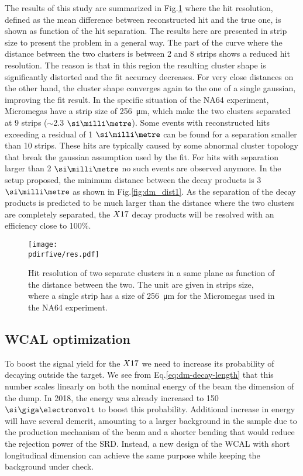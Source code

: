 The results of this study are summarized in Fig.\ref{fig:res-hit} where the hit resolution, defined as the mean difference between reconstructed hit and the true one, is shown as function of the hit separation. The results here are presented in strip size to present the problem in a general way. The part of the curve where the distance between the two clusters is between 2 and 8 strips shows a reduced hit resolution. The reason is that in this region the resulting cluster shape is significantly distorted and the fit accuracy decreases. For very close distances on the other hand, the cluster shape converges again to the one of a single gaussian, improving the fit result. In the specific situation of the NA64 experiment, Micromegas have a strip size of \SI{256}{\micro\meter}, which make the two clusters separated at 9 strips ($\sim$2.3 $\mmi$). Some events with reconstructed hits exceeding a residual of 1 $\mmi$ can be found for a separation smaller than 10 strips. These hits are typically caused by some abnormal cluster topology that break the gaussian assumption used by the fit. For hits with separation larger than 2 $\mmi$ no such events are observed anymore. In the setup proposed, the minimum distance between the decay products is 3 $\mmi$ as shown in Fig.\ref{fig:dm_dist1}. As the separation of the decay products is predicted to be much larger than the distance where the two clusters are completely separated, the $X17$ decay products will be resolved with an efficiency close to 100\%.

\begin{figure}[tbh!]
  \centering
  \texttt{[image: \\pdirfive/res.pdf]}
  \caption[Hit resolution as function of the two cluster distance]{Hit resolution of two separate clusters in a same plane as function of the distance between the two. The unit are given in strips size, where a single strip has a size of \SI{256}{\micro\meter} for the Micromegas used in the NA64 experiment.}
  \label{fig:res-hit}
\end{figure}

\subsection{WCAL optimization}
\label{ch5:sec:new-vismode-setup-wcal}

To boost the signal yield for the $X17$ we need to increase its probability of decaying outside the target. We see from Eq.\ref{eq:dm-decay-length} that this number scales linearly on both the nominal energy of the beam the dimension of the dump. In 2018, the energy was already increased to 150 $\gev$ to boost this probability. Additional increase in energy will have several demerit, amounting to a larger background in the sample due to the production mechanism of the beam and a shorter bending that would reduce the rejection power of the SRD. Instead, a new design of the WCAL with short longitudinal dimension can achieve the same purpose while keeping the background under check.

